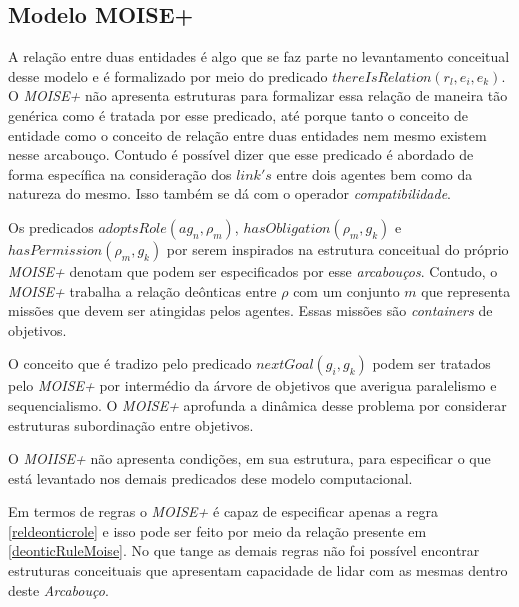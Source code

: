 \subsection{Modelo MOISE+}

A relação entre duas entidades é algo que se faz parte no levantamento conceitual desse modelo e é formalizado por meio do predicado $thereIsRelation(r_l,e_i,e_k)$. O \textit{MOISE+} não apresenta estruturas para formalizar essa relação de maneira tão genérica como é tratada por esse predicado, até porque tanto o conceito de entidade como o conceito de relação entre duas entidades nem mesmo existem nesse arcabouço. Contudo é possível dizer que esse predicado é abordado de forma específica na consideração dos $link's$ entre dois agentes bem como da natureza do mesmo. Isso também se dá com o operador \textit{compatibilidade}. 

Os predicados $adoptsRole(ag_n,\rho_m)$, $hasObligation(\rho_m,g_k)$ e $hasPermission(\rho_m,g_k)$ por serem inspirados na estrutura conceitual do próprio \textit{MOISE+} denotam que podem ser especificados por esse \textit{arcabouços}. Contudo, o \textit{MOISE+} trabalha a relação deônticas entre $\rho$ com um conjunto $m$ que representa missões que devem ser atingidas pelos agentes. Essas missões são \textit{containers} de objetivos.

O conceito que é tradizo pelo predicado $nextGoal(g_i,g_k)$ podem ser tratados pelo \textit{MOISE+} por intermédio da árvore de objetivos que averigua paralelismo e sequencialismo. O \textit{MOISE+} aprofunda a dinâmica desse problema por considerar estruturas subordinação entre objetivos. 

O \textit{MOIISE+} não apresenta condições, em sua estrutura, para especificar o que está levantado nos demais predicados dese modelo computacional. 

Em termos de regras o \textit{MOISE+} é capaz de especificar apenas a regra \ref{reldeonticrole} e isso pode ser feito por meio da relação presente em \ref{deonticRuleMoise}. No que tange as demais regras não foi possível encontrar estruturas conceituais que apresentam capacidade de lidar com as mesmas dentro deste \textit{Arcabouço}.  